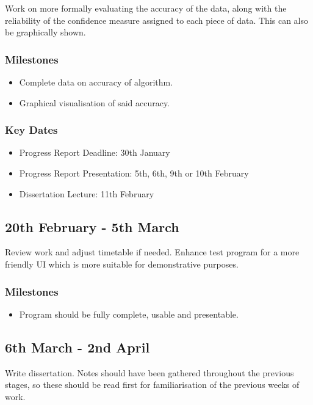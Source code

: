 \documentclass[12pt]{article}
\begin{document}
Work on more formally evaluating the accuracy of the data, along with the reliability of the confidence measure assigned to each piece of data.
This can also be graphically shown.

\subsubsection*{Milestones}
\begin{itemize}
	\item Complete data on accuracy of algorithm.
	\item Graphical visualisation of said accuracy.
\end{itemize}

\subsubsection*{Key Dates}
\begin{itemize}
	\item Progress Report Deadline: 30th January
	\item Progress Report Presentation: 5th, 6th, 9th or 10th February
	\item Dissertation Lecture: 11th February
\end{itemize}

\subsection*{20th February - 5th March}%

Review work and adjust timetable if needed. Enhance test program for a more friendly UI which is more suitable for demonstrative purposes.

\subsubsection*{Milestones}
\begin{itemize}
	\item Program should be fully complete, usable and presentable.
\end{itemize}

\subsection*{6th March - 2nd April}%

Write dissertation. Notes should have been gathered throughout the previous stages, so these should be read first for familiarisation of the previous weeks of work.
\end{document}

